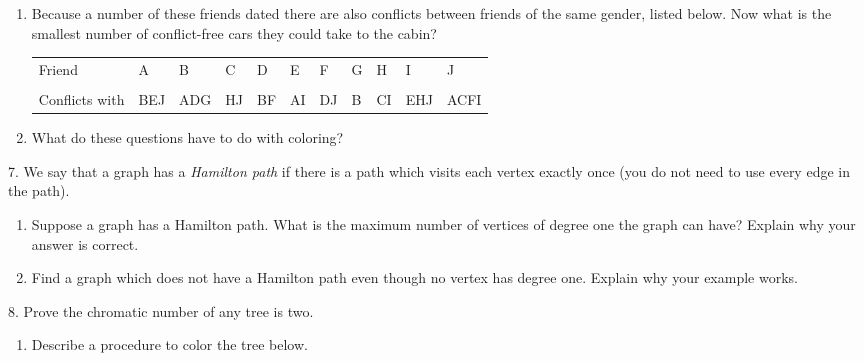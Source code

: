 \documentclass[10pt,]{book}
\theoremstyle{plain}
\theoremstyle{definition}
\theoremstyle{definition}
\theoremstyle{definition}
\numberwithin{equation}{chapter}
\newcommand{\hrulethin}  {\noalign{\hrule height 0.04em}}
\newcommand{\vtx}[2]{node[fill,circle,inner sep=0pt, minimum size=4pt,label=#1:#2]{}}
\renewcommand{\v}{\vtx{above}{}}
\begin{document}
\begin{exerciselist}
\begin{enumerate}[label=(\alph*)]
\item\hypertarget{li-1310}{}
                Because a number of these friends dated there are also conflicts between friends of the same gender, listed below. Now what is the smallest number of conflict-free cars they could take to the cabin?
                \begin{tabular}{lllllllllll}
Friend&A&B&C&D&E&F&G&H&I&J\tabularnewline[0pt]
&\tabularnewline\hrulethin
Conflicts with&BEJ&ADG&HJ&BF&AI&DJ&B&CI&EHJ&ACFI
\end{tabular}


\item\hypertarget{li-1311}{}
                What do these questions have to do with coloring?


\end{enumerate}
\par\smallskip
\item[7.]\hypertarget{exercise-319}{}
            We say that a graph has a \emph{Hamilton path} if there is a path which visits each vertex exactly once (you do not need to use every edge in the path).
\leavevmode%
\begin{enumerate}[label=(\alph*)]
\item\hypertarget{li-1312}{}
                Suppose a graph has a Hamilton path. What is the maximum number of vertices of degree one the graph can have? Explain why your answer is correct.



\item\hypertarget{li-1313}{}
                Find a graph which does not have a Hamilton path even though no vertex has degree one. Explain why your example works.



\end{enumerate}
\par\smallskip
\item[8.]\hypertarget{exercise-320}{}
            Prove the chromatic number of any tree is two.
\leavevmode%
\begin{enumerate}[label=(\alph*)]
\item\hypertarget{li-1314}{}
                Describe a procedure to color the tree below.
                \leavevmode%
\begin{figure}
\centering
{
}
\end{figure}



\end{enumerate}
\end{exerciselist}
\end{document}
